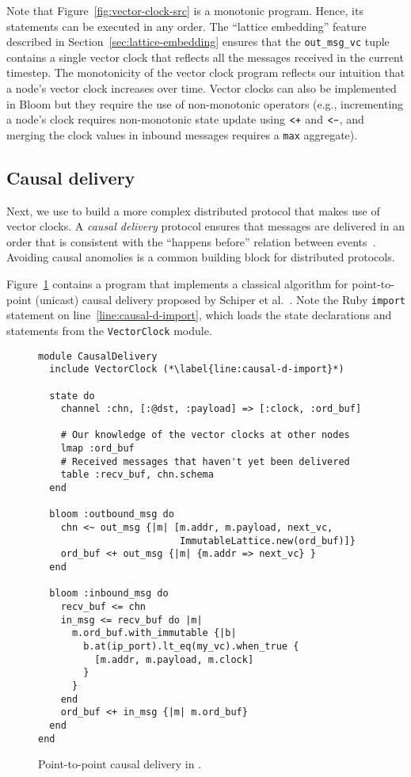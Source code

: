 Note that Figure~\ref{fig:vector-clock-src} is a monotonic program. Hence, its
statements can be executed in any order. The ``lattice embedding'' feature
described in Section~\ref{sec:lattice-embedding} ensures that the
\texttt{out\_msg\_vc} tuple contains a single vector clock that reflects all the
messages received in the current timestep. The monotonicity of the vector clock
program reflects our intuition that a node's vector clock increases over
time. Vector clocks can also be implemented in Bloom but they require the use of
non-monotonic operators (e.g., incrementing a node's clock requires
non-monotonic state update using $\verb|<+|$ and $\verb|<-|$, and merging the
clock values in inbound messages requires a \texttt{max} aggregate).

\subsection{Causal delivery}
Next, we use \lang to build a more complex distributed protocol that makes use
of vector clocks. A \emph{causal delivery} protocol ensures that messages are
delivered in an order that is consistent with the ``happens before'' relation
between events~\cite{Lamport1978}. Avoiding causal anomolies is a common
building block for distributed protocols.

Figure~\ref{fig:causal-delivery-src} contains a \lang program that implements a
classical algorithm for point-to-point (unicast) causal delivery proposed by
Schiper et al.~\cite{Schiper1989}. Note the Ruby \texttt{import} statement on
line~\ref{line:causal-d-import}, which loads the \lang state declarations and
statements from the \texttt{VectorClock} module.

\begin{figure}[t]
\begin{scriptsize}
\begin{lstlisting}
module CausalDelivery
  include VectorClock (*\label{line:causal-d-import}*)

  state do
    channel :chn, [:@dst, :payload] => [:clock, :ord_buf]

    # Our knowledge of the vector clocks at other nodes
    lmap :ord_buf
    # Received messages that haven't yet been delivered
    table :recv_buf, chn.schema
  end

  bloom :outbound_msg do
    chn <~ out_msg {|m| [m.addr, m.payload, next_vc,
                         ImmutableLattice.new(ord_buf)]}
    ord_buf <+ out_msg {|m| {m.addr => next_vc} }
  end

  bloom :inbound_msg do
    recv_buf <= chn
    in_msg <= recv_buf do |m|
      m.ord_buf.with_immutable {|b|
        b.at(ip_port).lt_eq(my_vc).when_true {
          [m.addr, m.payload, m.clock]
        }
      }
    end
    ord_buf <+ in_msg {|m| m.ord_buf}
  end
end
\end{lstlisting}
\end{scriptsize}
\caption{Point-to-point causal delivery in \lang.}
\label{fig:causal-delivery-src}
\end{figure}
